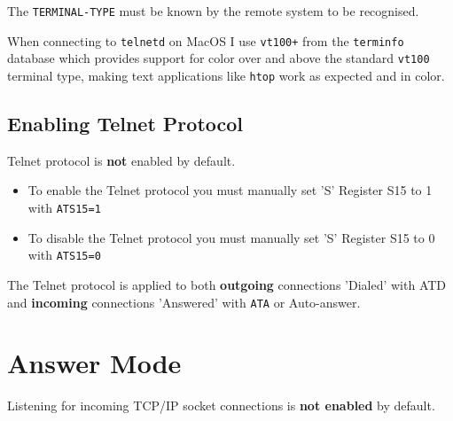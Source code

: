 The \texttt{TERMINAL-TYPE} must be known by the remote system to be recognised.

When connecting to \texttt{telnetd} on MacOS I use \texttt{vt100+} from the \texttt{terminfo} database which provides support for color over and above the standard \texttt{vt100} terminal type, making text applications like \texttt{htop} work as expected and in color.

\subsection{Enabling Telnet Protocol}

Telnet protocol is \textbf{not} enabled by default.

\begin{itemize}
\item To enable the Telnet protocol you must manually set 'S' Register S15 to 1 with \texttt{ATS15=1}
\item To disable the Telnet protocol you must manually set 'S' Register S15 to 0 with \texttt{ATS15=0}
\end{itemize}

The Telnet protocol is applied to both \textbf{outgoing} connections 'Dialed' with ATD and \textbf{incoming} connections 'Answered' with \texttt{ATA} or Auto-answer.


\newpage
\section{Answer Mode}

Listening for incoming TCP/IP socket connections is \textbf{not enabled} by default.

